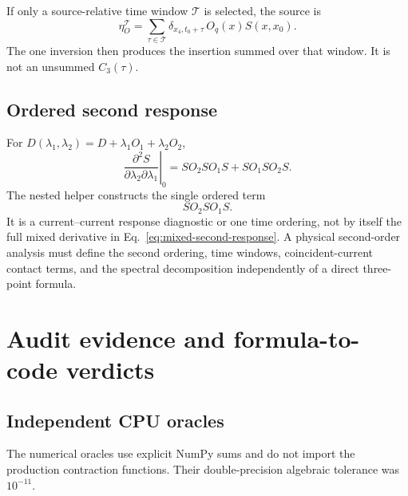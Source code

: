 \documentclass[11pt,a4paper]{article}
\numberwithin{equation}{section}
\begin{document}
If only a source-relative time window \(\mathcal T\) is selected, the source
is
\begin{equation}
 \eta_O^{\mathcal T}
 =\sum_{\tau\in\mathcal T}
 \delta_{x_4,t_0+\tau}\,O_q(x)S(x,x_0).
\end{equation}
The one inversion then produces the insertion summed over that window.  It is
not an unsummed \(C_3(\tau)\).

\subsection{Ordered second response}

For
\(D(\lambda_1,\lambda_2)=D+\lambda_1O_1+\lambda_2O_2\),
\begin{equation}
 \left.
 \frac{\partial^2S}{\partial\lambda_2\partial\lambda_1}
 \right|_0
 =SO_2SO_1S+SO_1SO_2S.
 \label{eq:mixed-second-response}
\end{equation}
The nested helper constructs the single ordered term
\begin{equation}
 SO_2SO_1S.
 \label{eq:ordered-response}
\end{equation}
It is a current--current response diagnostic or one time ordering, not by
itself the full mixed derivative in
Eq.~\eqref{eq:mixed-second-response}.  A physical second-order analysis must
define the second ordering, time windows, coincident-current contact terms,
and the spectral decomposition independently of a direct three-point
formula.

\section{Audit evidence and formula-to-code verdicts}

\subsection{Independent CPU oracles}

The numerical oracles use explicit NumPy sums and do not import the production
contraction functions.  Their double-precision algebraic tolerance was
\(10^{-11}\).
\end{document}
